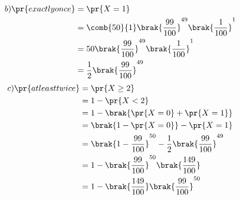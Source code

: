 \documentclass[journal,12pt,twocolumn]{IEEEtran}
\theoremstyle{remark}
\begin{document}
 \begin{align}
b) \pr{exactly once} &= \pr{X=1} \\
  &= \comb{50}{1}\brak{\frac{99}{100}}^{49}\brak{\frac{1}{100}}^{1} \\
  &= 50\brak{\frac{99}{100}}^{49}\brak{\frac{1}{100}}^{1} \\
  &= \frac{1}{2}\brak{\frac{99}{100}}^{49}
\end{align} 
\begin{align}
c) \pr{atleast twice} &= \pr{X \geq 2} \\
   &= 1 - \pr{X<2} \\
   &= 1 - \brak{\pr{X=0}+\pr{X=1}} \\
 &= \brak{1 - \pr{X=0}} - \pr{X=1} \\
   &= \brak{1 - \frac{99}{100}}^{50} - \frac{1}{2}\brak{\frac{99}{100}}^{49} \\
   &= 1 - \brak{\frac{99}{100}}^{50}\brak{\frac{149}{100}} \\
   &= 1 - \brak{\frac{149}{100}}\brak{\frac{99}{100}}^{50}
\end{align}
\end{document}
